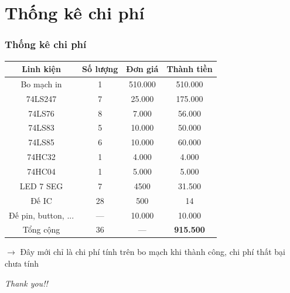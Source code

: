 \documentclass[12pt,a4paper]{beamer}
\begin{document}
\section{Thống kê chi phí}
\begin{frame}
	\frametitle{Thống kê chi phí}
	\begin{center}
		\begin{tabular}{|c|c|c|c|}
			\hline
			\textbf{Linh kiện} & \textbf{Số lượng} & \textbf{Đơn giá} & \textbf{Thành tiền} \\
			\hline
			Bo mạch in & 1 & 510.000 & 510.000 \\
			\hline
			74LS247 & 7 & 25.000 & 175.000 \\
			\hline
			74LS76 & 8 & 7.000 & 56.000 \\
			\hline
			74LS83 & 5 & 10.000 & 50.000 \\
			\hline
			74LS85 & 6 & 10.000 & 60.000 \\
			\hline
			74HC32 & 1 & 4.000 & 4.000 \\
			\hline
			74HC04 & 1 & 5.000 & 5.000 \\
			\hline
			LED 7 SEG & 7 & 4500 & 31.500 \\
			\hline
			Đế IC & 28 & 500 & 14\\
			\hline
			Đế pin, button, ... & --- & 10.000 & 10.000 \\
			\hline
			Tổng cộng & 36 & --- & \color{red}\textbf{915.500}\color{black}\\
			\hline
		\end{tabular}
	\end{center}
$\to$ Đây mới chỉ là chi phí tính trên bo mạch khi thành công, chi phí thất bại chưa tính
\end{frame}




\begin{frame}{}
	\centering \LARGE
	\emph{Thank you!!}
\end{frame}
\end{document}
